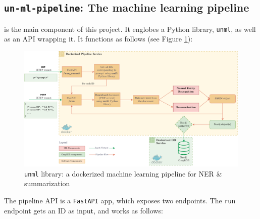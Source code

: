 
\subsection{\texttt{un-ml-pipeline}: The machine learning pipeline} \label{ssec:un-ml-pipeline-the-machine-learning-pipeline}

 is the main component of this project. It englobes a Python library, \texttt{unml}, as well as an API wrapping it. It functions as follows (see Figure \ref{fig:ml-pipeline}):


\begin{figure}[!htb]
    \centering

    \includegraphics[width=\linewidth]{res/ml-pipeline.pdf}
    \caption{\texttt{unml} library: a dockerized machine learning pipeline for NER \& summarization}

    \label{fig:ml-pipeline}
\end{figure}

The pipeline API is a \texttt{FastAPI} app, which exposes two endpoints. The \texttt{run} endpoint gets an ID as input, and works as follows:

